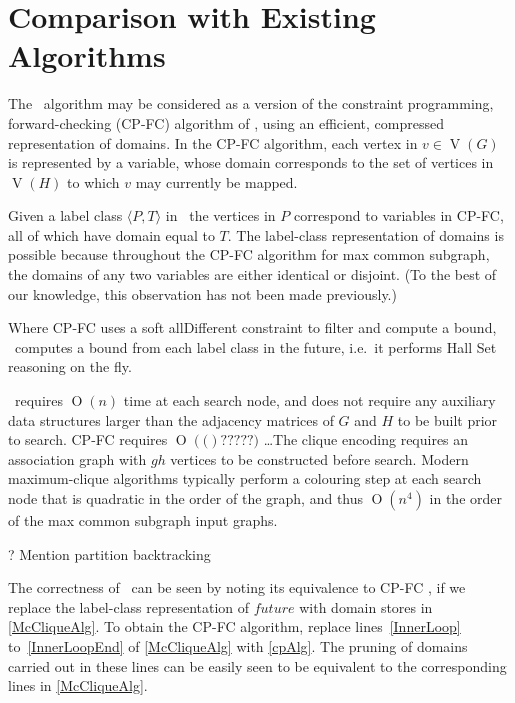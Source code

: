 \documentclass[letterpaper]{article}
\newcommand{\citep}[1]{\cite{#1}}
\newcommand{\McSplit}{\textproc{McSplit}}
\newcommand{\linerangeref}[2]{lines~\ref{#1} to~\ref{#2}}
\DeclareMathOperator{\V}{V}
\newcommand{\BigO}[1]{\ensuremath{\operatorname{O}\left(#1\right)}}
\begin{document}

\section{Comparison with Existing Algorithms}\label{sec:comparison} The
\McSplit\ algorithm may be considered as a version of the constraint
programming, forward-checking (CP-FC) algorithm of
\citep{DBLP:conf/cp/NdiayeS11}, using an efficient, compressed representation
of domains.  In the CP-FC algorithm, each vertex in $v \in \V(G)$
is represented by a variable, whose domain corresponds to the set of vertices
in $\V(H)$ to which $v$ may currently be mapped.

Given a label class $\langle P,T \rangle$ in \McSplit\, the vertices in $P$
correspond to variables in CP-FC, all of which have domain equal to $T$.  The
label-class representation of domains is possible because throughout the CP-FC
algorithm for max common subgraph, the domains of any two variables are either
identical or disjoint.  (To the best of our knowledge, this observation has
not been made previously.)

Where CP-FC uses a soft allDifferent constraint to filter and compute a bound,
\McSplit\ computes a bound from each label class in the future, i.e.\ it
performs Hall Set reasoning on the fly.

\McSplit\ requires $\BigO{n}$ time at each search node, and does not require
any auxiliary data structures larger than the adjacency matrices of $G$ and $H$
to be built prior to search.  CP-FC requires $\BigO(?????)$ \dots The clique
encoding requires an association graph with $g h$ vertices to be
constructed before search.  Modern maximum-clique algorithms typically perform
a colouring step at each search node that is quadratic in the order of the
graph, and thus $\BigO{n^4}$ in the order of the max common subgraph input
graphs.

? Mention partition backtracking

The correctness of \McSplit\ can be seen by noting its equivalence to CP-FC
\citep{DBLP:conf/cp/NdiayeS11}, if we replace the label-class representation of
$\mathit{future}$ with domain stores in \cref{McCliqueAlg}.  To obtain
the CP-FC algorithm, replace \linerangeref{InnerLoop}{InnerLoopEnd} of
\cref{McCliqueAlg} with \cref{cpAlg}.  The pruning of domains
carried out in these lines can be easily seen to be equivalent to the
corresponding lines in \cref{McCliqueAlg}.
\end{document}

